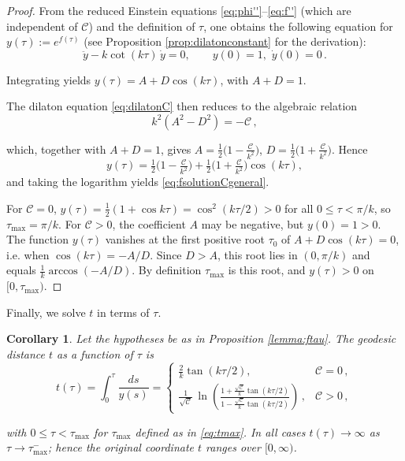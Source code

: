 \documentclass[12pt,a4paper,reqno]{amsart}
\theoremstyle{plain}
\newtheorem{corollary}[theorem]{Corollary}
\theoremstyle{remark}
\numberwithin{equation}{section}
\newcommand{\cC}{\mathcal{C}}
\begin{document}
\begin{proof}
From the reduced Einstein equations \eqref{eq:phi''}--\eqref{eq:f''} (which are independent of $\cC$) and the definition of $\tau$, one obtains the following equation for $y(\tau):=e^{f(\tau)}$ (see Proposition \ref{prop:dilatonconstant} for the derivation):
\begin{equation}\label{eq:yode}
\ddot{y} - k\cot(k\tau)\,\dot{y}=0,\qquad
y(0)=1,\,\, \dot{y}(0)=0 \,.
\end{equation}

Integrating yields $y(\tau)=A+D\cos(k\tau)$, with $A+D=1$.

The dilaton equation \eqref{eq:dilatonC} then reduces to the algebraic relation
\begin{equation*}
k^{2}(A^{2}-D^{2}) = -\cC \,,
\end{equation*}

which, together with $A+D=1$, gives $A=\frac12\big(1-\frac{\cC}{k^{2}}\big)$, $D=\frac12\big(1+\frac{\cC}{k^{2}}\big)$.  Hence
\begin{equation*}
y(\tau)=\tfrac12\big(1-\tfrac{\cC}{k^{2}}\big)+\tfrac12\big(1+\tfrac{\cC}{k^{2}}\big)\cos(k\tau),
\end{equation*}
and taking the logarithm yields \eqref{eq:fsolutionCgeneral}.

For $\cC=0$, $y(\tau)=\frac12(1+\cos k\tau)=\cos^{2}(k\tau/2)>0$ for all $0\le\tau<\pi/k$, so $\tau_{\max}=\pi/k$.  
For $\cC>0$, the coefficient $A$ may be negative, but $y(0)=1>0$.  The function $y(\tau)$ vanishes at the first positive root $\tau_{0}$ of $A+D\cos(k\tau)=0$, i.e. when $\cos(k\tau)=-A/D$.  Since $D>A$, this root lies in $(0,\pi/k)$ and equals $\frac{1}{k}\arccos(-A/D)$.  By definition $\tau_{\max}$ is this root, and $y(\tau)>0$ on $[0,\tau_{\max})$.
\end{proof}

Finally, we solve $t$ in terms of $\tau$.

\begin{corollary}\label{cor:taut}
Let the hypotheses be as in Proposition \ref{lemma:ftau}.  The geodesic distance $t$ as a function of $\tau$ is
\begin{equation}\label{eq:tfromtau}
t(\tau)=\int_{0}^{\tau}\frac{ds}{y(s)}
= \begin{cases}
\frac{2}{k}\tan(k\tau/2), & \cC=0 \,,\\[8pt]
\frac{1}{\sqrt{\cC}}\,
\ln\left(\frac{1+\frac{\sqrt{\cC}}{k}\tan(k\tau/2)}
{1-\frac{\sqrt{\cC}}{k}\tan(k\tau/2)}\right) \,, & \cC>0 \,,
\end{cases}
\end{equation}

with $0\le\tau<\tau_{\max}$ for $\tau_{\max}$ defined as in \eqref{eq:tmax}. In all cases $t(\tau)\to\infty$ as $\tau\to\tau_{\max}^{-}$; hence the original coordinate $t$ ranges over $[0,\infty)$.
\end{corollary}
\end{document}
